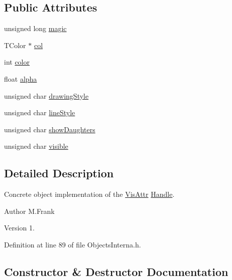 \subsection*{Public Attributes}
\begin{DoxyCompactItemize}
\item 
unsigned long \hyperlink{class_d_d4hep_1_1_geometry_1_1_vis_attr_object_ab8370d8a18bf092a48bde486479bbdff}{magic}
\item 
T\+Color $\ast$ \hyperlink{class_d_d4hep_1_1_geometry_1_1_vis_attr_object_a5ac12c903f90e8cf16eb04ba55568f38}{col}
\item 
int \hyperlink{class_d_d4hep_1_1_geometry_1_1_vis_attr_object_a1bff0c73a37bb6791006a4f0761d9f3a}{color}
\item 
float \hyperlink{class_d_d4hep_1_1_geometry_1_1_vis_attr_object_a9a5d2ab42c03b32cb5f69294881ac756}{alpha}
\item 
unsigned char \hyperlink{class_d_d4hep_1_1_geometry_1_1_vis_attr_object_ac6a253b99e112880c1ef727f9b9f9e73}{drawing\+Style}
\item 
unsigned char \hyperlink{class_d_d4hep_1_1_geometry_1_1_vis_attr_object_aaede923ed352bb5f43a809f6943f2061}{line\+Style}
\item 
unsigned char \hyperlink{class_d_d4hep_1_1_geometry_1_1_vis_attr_object_a7fc2c6d4195f0c8524315272a81436e6}{show\+Daughters}
\item 
unsigned char \hyperlink{class_d_d4hep_1_1_geometry_1_1_vis_attr_object_a316d66f51e43f6601839b271072a4765}{visible}
\end{DoxyCompactItemize}


\subsection{Detailed Description}
Concrete object implementation of the \hyperlink{class_d_d4hep_1_1_geometry_1_1_vis_attr}{Vis\+Attr} \hyperlink{class_d_d4hep_1_1_handle}{Handle}. 

\begin{DoxyAuthor}{Author}
M.\+Frank 
\end{DoxyAuthor}
\begin{DoxyVersion}{Version}
1. 
\end{DoxyVersion}


Definition at line 89 of file Objects\+Interna.\+h.



\subsection{Constructor \& Destructor Documentation}
\hypertarget{class_d_d4hep_1_1_geometry_1_1_vis_attr_object_ae88bf67cabcbfd4582037897a05f25bb}{}\label{class_d_d4hep_1_1_geometry_1_1_vis_attr_object_ae88bf67cabcbfd4582037897a05f25bb} 
